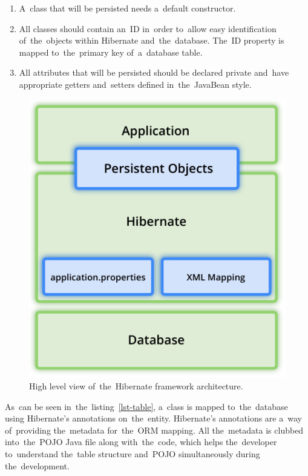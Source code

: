 \begin{enumerate}
  \item A~class that will be persisted needs a~default constructor.
  \item All classes should contain an~ID in~order to~allow easy identification
  of~the~objects within Hibernate and~the~database. The~ID property is mapped
  to~the~primary key of~a~database table.
  \item All attributes that will be persisted should be declared private
  and~have appropriate getters and~setters defined in~the~JavaBean style.
\end{enumerate}

\begin{figure}[!hbt]
	\centering
	\includegraphics[scale=0.8]{./figures/hibernate-architecture.pdf}
	\caption{High level view of~the~Hibernate framework architecture.}
	\label{fig-hibernate}
\end{figure}

As~can be seen in~the~listing~\ref{lst-table}, a~class is mapped to~the~database
using Hibernate's annotations on~the~entity. Hibernate's annotations are a~way
of~providing the~metadata for~the~ORM mapping. All the~metadata is clubbed
into~the~POJO Java file along with~the~code, which helps the~developer
to~understand the~table structure and~POJO simultaneously during
the~development.

